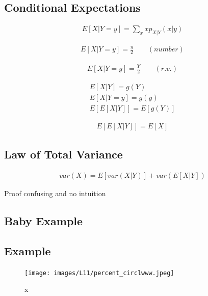 \documentclass{article}
\begin{document}
\subsection{Conditional Expectations}


\begin{align*}
    E[X|Y=y]= \sum_x x p_{X|Y}(x|y)
\end{align*}

\begin{align*}
    E[X|Y=y]=\frac{y}{2} \qquad (number)
\end{align*}

\begin{align*}
    E[X|Y=y]=\frac{Y}{2} \qquad (r.v.)
\end{align*}


\begin{align*}
    E[X|Y]=g(Y)\\
    E[X|Y=y]=g(y)\\
    E[E[X|Y]]=E[g(Y)]
\end{align*}

\begin{align*}
E[E[X|Y]]=E[X]
\end{align*}

\subsection{Law of Total Variance}

\begin{align*}
var(X) = E[var(X|Y)] + var(E[X|Y])
\end{align*}

Proof confusing and no intuition



\subsection{Baby Example}


\subsection{Example}

\begin{figure}[h]
\centering
\texttt{[image: images/L11/percent\_circlwww.jpeg]}
\caption{x}
\end{figure}
\end{document}
